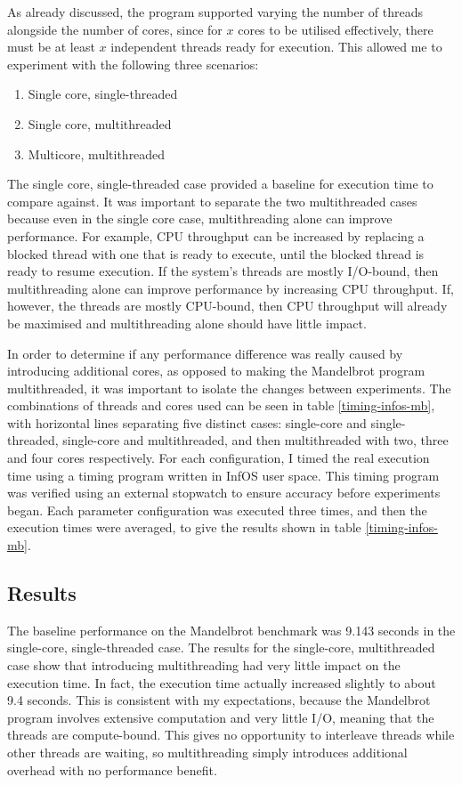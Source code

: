 \documentclass[bsc,frontabs,singlespacing,parskip,deptreport]{infthesis}
\begin{document}
As already discussed, the program supported varying the number of threads alongside the number of cores, since for $x$ cores to be utilised effectively, there must be at least $x$ independent threads ready for execution. This allowed me to experiment with the following three scenarios:

\begin{enumerate}
    \item Single core, single-threaded 
    \item Single core, multithreaded 
    \item Multicore, multithreaded
\end{enumerate}

The single core, single-threaded case provided a baseline for execution time to compare against. It was important to separate the two multithreaded cases because even in the single core case, multithreading alone can improve performance. For example, CPU throughput can be increased by replacing a blocked thread with one that is ready to execute, until the blocked thread is ready to resume execution. If the system's threads are mostly I/O-bound, then multithreading alone can improve performance by increasing CPU throughput. If, however, the threads are mostly CPU-bound, then CPU throughput will already be maximised and multithreading alone should have little impact. 

In order to determine if any performance difference was really caused by introducing additional cores, as opposed to making the Mandelbrot program multithreaded, it was important to isolate the changes between experiments. The combinations of threads and cores used can be seen in table \ref{timing-infos-mb}, with horizontal lines separating five distinct cases: single-core and single-threaded, single-core and multithreaded, and then multithreaded with two, three and four cores respectively. For each configuration, I timed the real execution time using a timing program written in InfOS user space. This timing program was verified using an external stopwatch to ensure accuracy before experiments began. Each parameter configuration was executed three times, and then the execution times were averaged, to give the results shown in table \ref{timing-infos-mb}.

\subsection{Results} \label{mb-benchmark-results}
The baseline performance on the Mandelbrot benchmark was 9.143 seconds in the single-core, single-threaded case. The results for the single-core, multithreaded case show that introducing multithreading had very little impact on the execution time. In fact, the execution time actually increased slightly to about 9.4 seconds. This is consistent with my expectations, because the Mandelbrot program involves extensive computation and very little I/O, meaning that the threads are compute-bound. This gives no opportunity to interleave threads while other threads are waiting, so multithreading simply introduces additional overhead with no performance benefit. 
\end{document}
